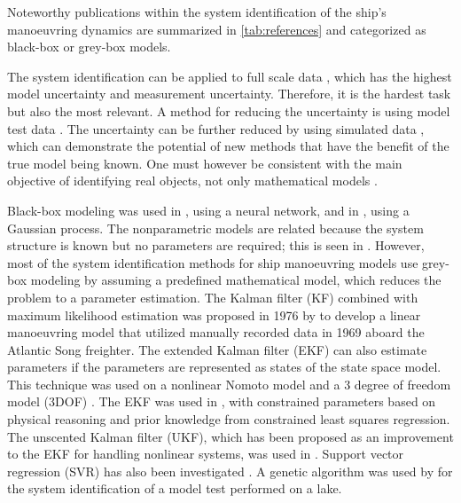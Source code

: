 Noteworthy publications within the system identification of the ship's manoeuvring dynamics are summarized in \autoref{tab:references} and categorized as black-box or grey-box models.
 
The system identification can be applied to full scale data \cite{astrom_identification_1976,revestido_herrero_two-step_2012,perera_system_2015}, which has the highest model uncertainty and measurement uncertainty. Therefore, it is the hardest task but also the most relevant. A method for reducing the uncertainty is using model test data \cite{araki_estimating_2012,luo_parameter_2016,xue_identification_2021,miller_ship_2021, he_nonparametric_2022}. The uncertainty can be further reduced by using simulated data \cite{shi_identification_2009,zhu_parameter_2017,wang_parameter_2021}, which can demonstrate the potential of new methods that have the benefit of the true model being known. One must however be consistent with the main objective of identifying real objects, not only mathematical models \cite{miller_ship_2021}.

\noindent Black-box modeling was used in \textcite{he_nonparametric_2022}, using a neural network, and in \textcite{xue_identification_2021}, using a Gaussian process. The nonparametric models are related because the system structure is known but no parameters are required; this is seen in \textcite{pongduang_nonparametric_2020}. However, most of the system identification methods for ship manoeuvring models use grey-box modeling by assuming a predefined mathematical model, which reduces the problem to a parameter estimation.
The Kalman filter (KF) combined with maximum likelihood estimation was proposed in 1976 by \textcite{astrom_identification_1976} to develop a linear manoeuvring model that utilized manually recorded data in 1969 aboard the Atlantic Song freighter. The extended Kalman filter (EKF) can also estimate parameters if the parameters are represented as states of the state space model. This technique was used on a nonlinear Nomoto model \cite{perera_system_2015} and a 3 degree of freedom model (3DOF) \cite{shi_identification_2009}. The EKF was used in \textcite{araki_estimating_2012}, with constrained parameters based on physical reasoning and prior knowledge from constrained least squares regression. The unscented Kalman filter (UKF), which has been proposed as an improvement to the EKF for handling nonlinear systems, was used in \textcite{revestido_herrero_two-step_2012}.
Support vector regression (SVR) has also been investigated  \cite{luo_parameter_2016,zhu_parameter_2017, wang_parameter_2021}. A genetic algorithm was used by \textcite{miller_ship_2021} for the system identification of a model test performed on a lake.





